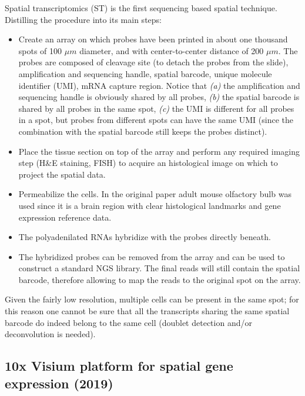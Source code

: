Spatial transcriptomics (ST) is the first sequencing based spatial technique.
Distilling the procedure into its main steps:
\begin{itemize}
\tightlist
\item 
  Create an array on which probes have been printed in about one thousand 
  spots of 100 $\mu m$ diameter, and with center-to-center distance of 200 
  $\mu m$. The probes are composed of cleavage site (to detach the probes 
  from the slide), amplification and sequencing handle, spatial barcode, 
  unique molecule identifier (UMI), mRNA capture region. Notice that \emph{(a)}
  the amplification and sequencing handle is obviously shared by all probes, 
  \emph{(b)} the spatial barcode is shared by all probes in the same spot, 
  \emph{(c)} the UMI is different for all probes in a spot, but probes from
  different spots can have the same UMI (since the combination with the spatial
  barcode still keeps the probes distinct).
\item 
  Place the tissue section on top of the array and perform any required 
  imaging step (H\&E staining, FISH) to acquire an histological image on 
  which to project the spatial data.
\item
  Permeabilize the cells. In the original paper adult mouse olfactory bulb 
  was used since it is a brain region with clear histological landmarks and 
  gene expression reference data.
\item 
  The polyadenilated RNAs hybridize with the probes directly beneath.
\item 
  The hybridized probes can be removed from the array and can be used to 
  construct a standard NGS library. The final reads will still contain the 
  spatial barcode, therefore allowing to map the reads to the original spot on 
  the array.
\end{itemize}

Given the fairly low resolution, multiple cells can be present in the same 
spot; for this reason one cannot be sure that all the transcripts sharing the 
same spatial barcode do indeed belong to the same cell (doublet detection 
and/or deconvolution is needed).

\hypertarget{x-visium-platform-for-spatial-gene-expression-2019}{%
\subsection{10x Visium platform for spatial gene expression
(2019)}\label{x-visium-platform-for-spatial-gene-expression-2019}}

